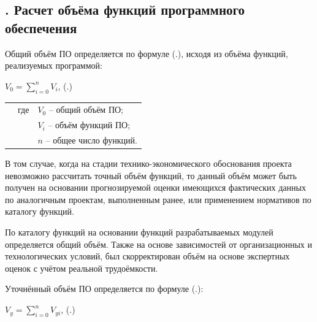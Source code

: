 \subtitlespace

\subsection*{ 
    \gostTitleFont
    \redline
    \thechaptercntr .\thesubchaptercntr \spc
    Расчет объёма функций программного обеспечения
} \addtocounter{subchaptercntr}{1}

\subtitlespace

{\gostFont
    
    \par \redline Общий объём ПО определяется по формуле (\thechaptercntr .\theformulacntr), исходя из объёма функций, реализуемых программой:
    
    \formulaspace 
    \par \redline $V_0 = \sum_{i=0}^{n}V_i$,
    \hfill (\thechaptercntr .\theformulacntr) \hspace*{-0.5cm}\redline
    \formulaspace \addtocounter{formulacntr}{1}

    \begin{tabular}{p{0.875cm}p{0.3cm}p{15.175cm}}
        & где  & $V_0$ {--} общий объём ПО; \\
        &      & $V_i$ {--} объём функций ПО; \\
        &      & $n$ {--} общее число функций. \\
    \end{tabular}
    \vspace{13pt}
    
    \par \redline В том случае, когда на стадии технико-экономического обоснования проекта невозможно рассчитать точный объём функций, то данный объём может быть получен на основании прогнозируемой оценки имеющихся фактических данных по аналогичным проектам, выполненным ранее, или применением нормативов по каталогу функций.
    
    \par \redline По каталогу функций на основании функций разрабатываемых модулей определяется общий объём. Также на основе зависимостей от организационных и технологических условий, был скорректирован объём на основе экспертных оценок с учётом реальной трудоёмкости.
    
    \par \redline Уточнённый объём ПО определяется по формуле (\thechaptercntr .\theformulacntr):
    
    \formulaspace 
    \par \redline $V_y = \sum_{i=0}^{n}V_{yi}$,
    \hfill (\thechaptercntr .\theformulacntr) \hspace*{-0.5cm}\redline
    \formulaspace \addtocounter{formulacntr}{1}
    
}
